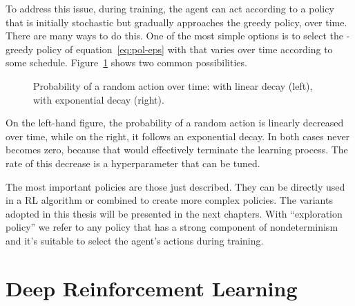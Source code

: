 To address this issue, during training, the agent can act according to a
policy that is initially stochastic but gradually approaches the greedy
policy, over time. There are many ways to do this. One of the most simple
options is to select the \eps{}-greedy policy of equation~\eqref{eq:pol-eps}
with \eps{} that varies over time according to some schedule.
Figure~\ref{fig:policy-schedules} shows two common possibilities.
\begin{figure}
	\centering
	\qquad
	\caption{Probability of a random action over time: \eps{} with linear decay
	(left), \eps{} with exponential decay (right).}
	\label{fig:policy-schedules}
\end{figure}
On the left-hand figure, the probability of a random action is linearly
decreased over time, while on the right, it follows an exponential decay. In
both cases \eps{} never becomes zero, because that would effectively terminate
the learning process. The rate of this decrease is a hyperparameter that
can be tuned.

The most important policies are those just described. They can be directly
used in a RL algorithm or combined to create more complex policies.  The
variants adopted in this thesis will be presented in the next chapters.  With
``exploration policy'' we refer to any policy that has a strong component of
nondeterminism and it's suitable to select the agent's actions during
training.


\section{Deep Reinforcement Learning}

\label{sec:deep-rl}

